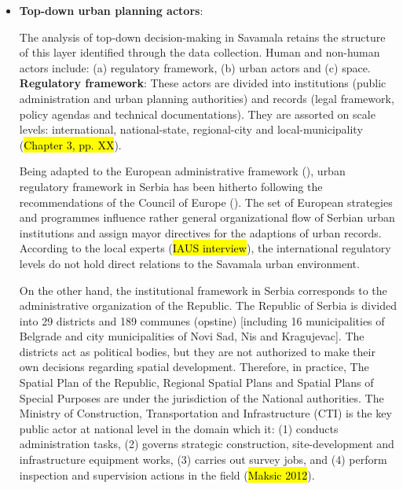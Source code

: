 \documentclass[11pt]{report}
\begin{document}
\begin{itemize}
\item \textbf{Top-down urban planning actors}:

The analysis of top-down decision-making in Savamala retains the structure of this layer identified through the data collection.
Human and non-human actors include:
(a) regulatory framework,
(b) urban actors
and
(c) space.
\\

\textbf{Regulatory framework}: 
These actors are divided into institutions (public administration and urban planning authorities) and records (legal framework, policy agendas and technical documentations).
They are assorted on scale levels: international, national-state, regional-city and local-municipality (\hl{Chapter 3, pp. XX}). 

Being adapted to the European administrative framework (\cite{Official gazette RS 09/2014}), urban regulatory framework in Serbia has been hitherto following the recommendations of the Council of Europe
(\cite{Urbani razvoj u Srbiji Ministry of Space 2014}). The set of European strategies and programmes influence rather general organizational flow of Serbian urban institutions and assign mayor directives for the adaptions of urban records.
According to the local experts
(\hl{IAUS interview}), the international regulatory levels do not hold direct relations to the Savamala urban environment.

On the other hand, the institutional framework in Serbia corresponds to the administrative organization of the Republic.
The Republic of Serbia is divided into 29 districts and 189 communes (opstine) [including 16 municipalities of Belgrade and city municipalities of Novi Sad, Nis and Kragujevac].
The districts act as political bodies, but they are not authorized to make their own decisions regarding spatial development.
Therefore, in practice, The Spatial Plan of the Republic, Regional Spatial Plans and Spatial Plans of Special Purposes are under the jurisdiction of the National authorities. 
The Ministry of Construction, Transportation and Infrastructure (CTI) is the key public actor at national level in the domain which it:
(1) conducts administration tasks,
(2) governs strategic construction, site-development and infrastructure equipment works,
(3) carries out survey jobs,
and
(4) perform inspection and supervision actions in the field (\hl{Maksic 2012}).


\end{itemize}
\end{document}
